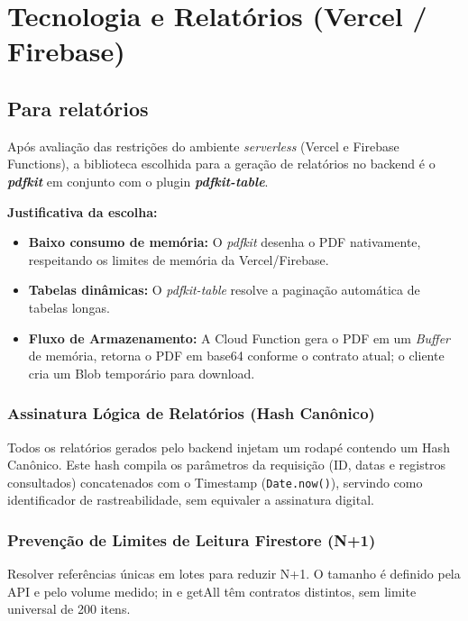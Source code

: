 \newpage
\section{Tecnologia e Relatórios (Vercel / Firebase)}

\subsection{Para relatórios}
Após avaliação das restrições do ambiente \textit{serverless} (Vercel e Firebase Functions), a biblioteca escolhida para a geração de relatórios no backend é o \textbf{\textit{pdfkit}} em conjunto com o plugin \textbf{\textit{pdfkit-table}}.

\textbf{Justificativa da escolha:}
\begin{itemize}
    \item \textbf{Baixo consumo de memória:} O \textit{pdfkit} desenha o PDF nativamente, respeitando os limites de memória da Vercel/Firebase.
    \item \textbf{Tabelas dinâmicas:} O \textit{pdfkit-table} resolve a paginação automática de tabelas longas.
    \item \textbf{Fluxo de Armazenamento:} A Cloud Function gera o PDF em um \textit{Buffer} de memória, retorna o PDF em base64 conforme o contrato atual; o cliente cria um Blob temporário para download.
\end{itemize}

\subsubsection{Assinatura Lógica de Relatórios (Hash Canônico)}
Todos os relatórios gerados pelo backend injetam um rodapé contendo um Hash Canônico. Este hash compila os parâmetros da requisição (ID, datas e registros consultados) concatenados com o Timestamp (\texttt{Date.now()}), servindo como identificador de rastreabilidade, sem equivaler a assinatura digital.

\subsubsection{Prevenção de Limites de Leitura Firestore (N+1)}
Resolver referências únicas em lotes para reduzir N+1. O tamanho é definido pela API e pelo volume medido; in e getAll têm contratos distintos, sem limite universal de 200 itens.

